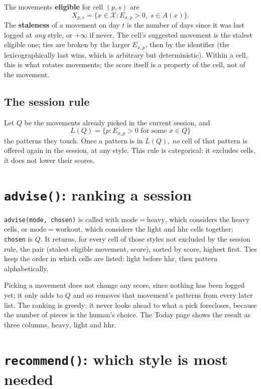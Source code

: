 \documentclass[11pt]{article}
\theoremstyle{plain}
\theoremstyle{definition}
\newcommand{\code}[1]{\texttt{#1}}
\newcommand{\Mov}{\mathcal{X}}
\newcommand{\light}{\mathrm{light}}
\newcommand{\heavy}{\mathrm{heavy}}
\newcommand{\hhr}{\mathrm{hhr}}
\begin{document}
The movements \textbf{eligible} for cell $(p, s)$ are
\[
X_{p,s} = \{ x \in \Mov : E_{x,p} > 0,\; s \in A(x) \}.
\]
The \textbf{staleness} of a movement on day $t$ is the number of days
since it was last logged at \emph{any} style, or $+\infty$ if never. The
cell's suggested movement is the stalest eligible one; ties are broken by
the larger $E_{x,p}$, then by the identifier (the lexicographically last
wins, which is arbitrary but deterministic). Within a cell, this is what
rotates movements; the score itself is a property of the cell, not of the
movement.

\subsection{The session rule}

Let $Q$ be the movements already picked in the current session, and
\[
L(Q) = \{ p : E_{x,p} > 0 \text{ for some } x \in Q \}
\]
the patterns they touch. Once a pattern is in $L(Q)$, \emph{no} cell of
that pattern is offered again in the session, at any style. This rule is
categorical: it excludes cells, it does not lower their scores.

\section{\texorpdfstring{\code{advise()}}{advise()}: ranking a session}\label{sec:advise}

\code{advise(mode, chosen)} is called with $\mathrm{mode} = \heavy$,
which considers the $\heavy$ cells, or $\mathrm{mode} = \mathrm{workout}$,
which considers the $\light$ and $\hhr$ cells together; \code{chosen} is
$Q$. It returns, for every cell of those styles not excluded by the
session rule, the pair (stalest eligible movement, score), sorted by
score, highest first. Ties keep the order in which cells are listed:
$\light$ before $\hhr$, then pattern alphabetically.

Picking a movement does not change any score, since nothing has been
logged yet; it only adds to $Q$ and so removes that movement's patterns
from every later list. The ranking is greedy: it never looks ahead to
what a pick forecloses, because the number of pieces is the human's
choice. The Today page shows the result as three columns, $\heavy$,
$\light$ and $\hhr$.

\section{\texorpdfstring{\code{recommend()}}{recommend()}: which style is most needed}\label{sec:recommend}
\end{document}
